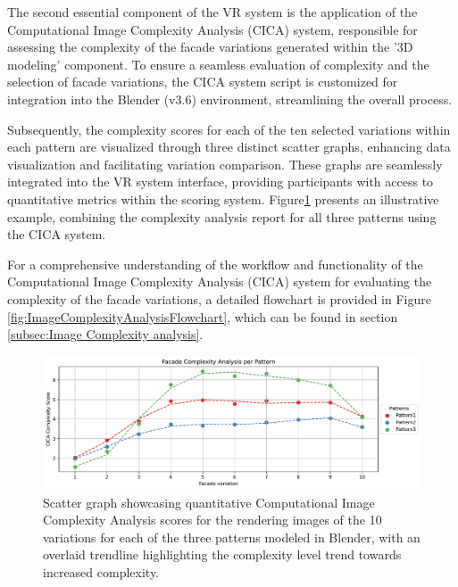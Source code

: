 %    

The second essential component of the VR system is the application of the Computational Image Complexity Analysis (CICA) system, responsible for assessing the complexity of the facade variations generated within the '3D modeling' component.
To ensure a seamless evaluation of complexity and the selection of facade variations, the CICA system script is customized for integration into the Blender (v3.6) environment, streamlining the overall process.

Subsequently, the complexity scores for each of the ten selected variations within each pattern are visualized through three distinct scatter graphs, enhancing data visualization and facilitating variation comparison.
These graphs are seamlessly integrated into the VR system interface, providing participants with access to quantitative metrics within the scoring system.
Figure\ref{fig:complexitygraphRender} presents an illustrative example, combining the complexity analysis report for all three patterns using the CICA system.

For a comprehensive understanding of the workflow and functionality of the Computational Image Complexity Analysis (CICA) system for evaluating the complexity of the facade variations, a detailed flowchart is provided in Figure \ref{fig:ImageComplexityAnalysisFlowchart}, which can be found in section \ref{subsec:Image Complexity analysis}.

     \begin{figure}[!htb]
          \centering
          \includegraphics[width= \linewidth]{Graphs/complexitygraphrender}
          \caption{Scatter graph showcasing quantitative Computational Image Complexity Analysis scores for the rendering images of the 10 variations for each of the three patterns modeled in Blender, with an overlaid trendline highlighting the complexity level trend towards increased complexity.}
          \label{fig:complexitygraphRender}
        \end{figure}
